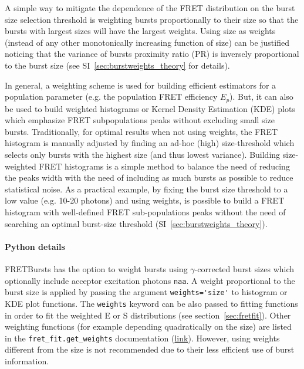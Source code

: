\documentclass[10pt,letterpaper]{article}
\begin{document}
A simple way to mitigate the dependence of the FRET distribution on 
the burst size selection threshold is weighting bursts proportionally to their size 
so that the bursts with largest sizes will have the largest weights.
Using size as weights (instead of any other monotonically increasing function
of size) can be justified noticing that the variance of bursts proximity ratio (PR) is
inversely proportional to the burst size (see SI~\ref{sec:burstweights_theory} for details). 

In general, a weighting scheme is used for building efficient estimators for a population
parameter (e.g. the population FRET efficiency $E_p$). 
But, it can also be used to build weighted histograms or Kernel Density
Estimation (KDE) plots which emphasize FRET subpopulations peaks 
without excluding small size bursts.
Traditionally, for optimal results when not using weights, the 
FRET histogram is manually adjusted by finding an ad-hoc (high) 
size-threshold which selects only bursts with the highest size (and thus lowest variance).
Building size-weighted FRET histograms is a simple method to balance 
the need of reducing the peaks width with the need of including as much bursts
as possible to reduce statistical noise.
As a practical example, by fixing the burst size threshold to a low value (e.g. 10-20 photons)
and using weights, is possible to build a FRET histogram with well-defined FRET sub-populations peaks 
without the need of searching an optimal burst-size threshold (SI~\ref{sec:burstweights_theory}).

\paragraph{Python details}
FRETBursts has the option to weight bursts using $\gamma$-corrected
burst sizes which optionally include acceptor excitation photons \verb|naa|.
A weight proportional to the burst size is applied by passing the argument
\verb|weights='size'| to histogram or KDE plot functions. The \verb|weights|
keyword can be also passed to fitting functions in order to fit
the weighted E or S distributions (see section~\ref{sec:fretfit}).
Other weighting functions (for example depending quadratically on the size) 
are listed in the \verb|fret_fit.get_weights| documentation
(\href{http://fretbursts.readthedocs.org/en/latest/fret_fit.html#fretbursts.fret_fit.get_weights}{link}).
However, using weights different from the size is not recommended 
due to their less efficient use of burst information.
\end{document}
